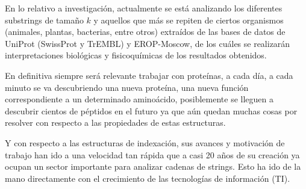En lo relativo a investigación, actualmente se está analizando los diferentes substrings de tamaño $k$ y aquellos que más se repiten de ciertos organismos (animales, plantas, bacterias, entre otros) extraídos de las bases de datos de UniProt (SwissProt y TrEMBL) y EROP-Moscow, de los cuáles se realizarán interpretaciones biológicas y fisicoquímicas de los resultados obtenidos.

En definitiva siempre será relevante trabajar con proteínas, a cada día, a cada minuto se va descubriendo una nueva proteína, una nueva función correspondiente a un determinado aminoácido, posiblemente se lleguen a descubrir cientos de péptidos en el futuro ya que aún quedan muchas cosas por resolver con respecto a las propiedades de estas estructuras.

Y con respecto a las estructuras de indexación, sus avances y motivación de trabajo han ido a una velocidad tan rápida que a casi 20 años de su creación ya ocupan un sector importante para analizar cadenas de strings. Esto ha ido de la mano directamente con el crecimiento de las tecnologías de información (TI).